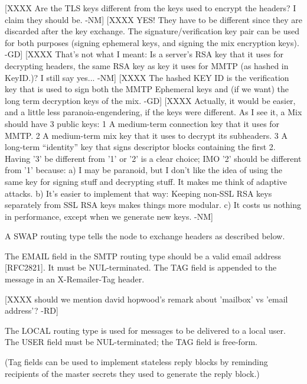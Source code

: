 [XXXX Are the TLS keys different from the keys used to encrypt the
      headers?  I claim they should be. -NM]
[XXXX YES! They have to be different since they are discarded after
      the key exchange. The signature/verification key pair can be
      used for both purposes (signing ephemeral keys, and signing the
      mix encryption keys). -GD]
[XXXX That's not what I meant:  Is a server's RSA key that it uses 
      for decrypting headers, the same RSA key as key it uses for
      MMTP (as hashed in KeyID.)?  I still say yes... -NM]
[XXXX The hashed KEY ID is the verification key that is used to sign
      both the MMTP Ephemeral keys and (if we want) the long term
      decryption keys of the mix. -GD]
[XXXX Actually, it would be easier, and a little less paranoia-engendering,
      if the keys were different.  As I see it, a Mix should have 3
      public keys:
              1  A medium-term connection key that it uses for MMTP.
              2  A medium-term mix key that it uses to decrypt 
                 its subheaders.
              3  A long-term ``identity'' key that signs descriptor
                 blocks containing the first 2.
         Having '3' be different from '1' or '2' is a clear choice; 
         IMO '2' should be different from '1' because:
                a) I may be paranoid, but I don't like the idea of 
                   using the same key for signing stuff and decrypting
                   stuff.  It makes me think of adaptive attacks.
                b) It's easier to implement that way: Keeping non-SSL 
                   RSA keys separately from SSL RSA keys makes things
                   more modular.
                c) It costs us nothing in performance, except when
                   we generate new keys.
             -NM]

A SWAP routing type tells the node to exchange headers as described below.

The EMAIL field in the SMTP routing type should be a valid email
address [RFC2821].  It must be NUL-terminated.  The TAG field is
appended to the message in an X-Remailer-Tag header.

[XXXX should we mention david hopwood's remark about 'mailbox' vs
 'email address'? -RD]

The LOCAL routing type is used for messages to be delivered to a local
user.  The USER field must be NUL-terminated; the TAG field is
free-form.

(Tag fields can be used to implement stateless reply blocks by
reminding recipients of the master secrets they used to generate the
reply block.)


